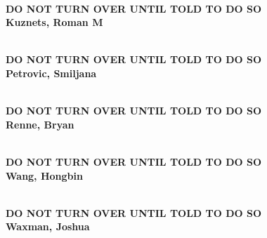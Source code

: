 \documentclass[11pt]{article}
\begin{document}
\begin{center}
{\Large\bf
\mbox{\ }\\
\vspace{1in}
DO NOT TURN OVER UNTIL TOLD TO DO SO\\
\vspace{1in}
Kuznets, Roman M
}
\end{center}
\newpage

\begin{center}
{\Large\bf
\mbox{\ }\\
\vspace{1in}
DO NOT TURN OVER UNTIL TOLD TO DO SO\\
\vspace{1in}
Petrovic, Smiljana
}
\end{center}
\newpage

\begin{center}
{\Large\bf
\mbox{\ }\\
\vspace{1in}
DO NOT TURN OVER UNTIL TOLD TO DO SO\\
\vspace{1in}
Renne, Bryan
}
\end{center}
\newpage

\begin{center}
{\Large\bf
\mbox{\ }\\
\vspace{1in}
DO NOT TURN OVER UNTIL TOLD TO DO SO\\
\vspace{1in}
Wang, Hongbin
}
\end{center}
\newpage

\begin{center}
{\Large\bf
\mbox{\ }\\
\vspace{1in}
DO NOT TURN OVER UNTIL TOLD TO DO SO\\
\vspace{1in}
Waxman, Joshua}
\end{center}

 
\end{document}

